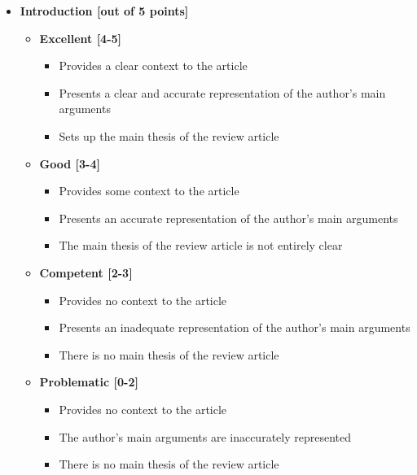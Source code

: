 \documentclass[letterpaper,12pt]{article}
\theoremstyle{dotlessS}
\begin{document}
\begin{itemize}
\item \textbf{Introduction [out of 5 points]}
\begin{itemize}
\item \textbf{Excellent [4-5]}
\begin{itemize}
\item Provides a clear context to the article
\item Presents a clear and accurate representation of the author's main arguments
\item Sets up the main thesis of the review article
\end{itemize}
\item \textbf{Good [3-4]}
\begin{itemize}
\item Provides some context to the article
\item Presents an accurate representation of the author's main arguments
\item The main thesis of the review article is not entirely clear
\end{itemize}
\item \textbf{Competent [2-3]}
\begin{itemize}
\item Provides no context to the article
\item Presents an inadequate representation of the author's main arguments
\item There is no main thesis of the review article 
\end{itemize}
\item \textbf{Problematic [0-2]}
\begin{itemize}
\item Provides no context to the article
\item The author's main arguments are inaccurately represented
\item There is no main thesis of the review article 
\end{itemize}
\end{itemize}



\end{itemize}
\end{document}
